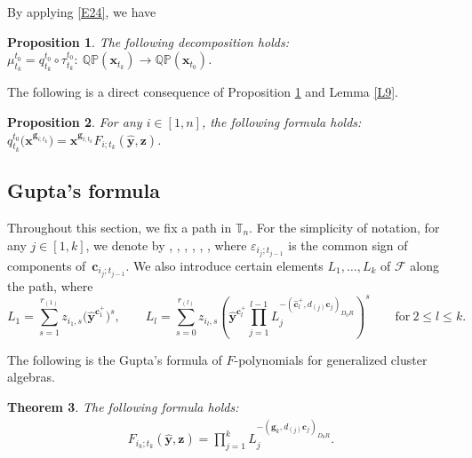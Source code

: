 \documentclass[pdftex]{sigma}
\numberwithin{equation}{section}
\newtheorem{Theorem}{Theorem}[section]
\newtheorem{Proposition}[Theorem]{Proposition}
 { \theoremstyle{definition}
\newtheorem{Definition}[Theorem]{Definition}
\newtheorem{Note}[Theorem]{Note}
\newtheorem{Example}[Theorem]{Example}
\newtheorem{Remark}[Theorem]{Remark} }
\begin{document}
By applying \eqref{E24}, we have
\begin{Proposition}\label{P11}
 The following decomposition holds:
$
\mu_{t_k}^{t_0}=q_{t_k}^{t_0}\circ\tau_{t_k}^{t_0}\colon\  \mathbb{QP}(\mathbf{x}_{t_k})\longrightarrow\mathbb{QP}(\mathbf{x}_{t_0})$.
\end{Proposition}

The following is a direct consequence of Proposition \ref{P11} and Lemma \ref{L9}.
\begin{Proposition}\label{p:FG-decomp}
 For any $i\in [1,n]$, the following formula holds:
$
 q_{t_k}^{t_0}\bigl(\mathbf{x}^{\mathbf{g}_{i;t_k}}\bigr)=\mathbf{x}^{\mathbf{g}_{i;t_k}}F_{i;t_k}(\hat{\mathbf{y}},\mathbf{z})$.
\end{Proposition}

\subsection{Gupta's formula}\label{S5}
Throughout this section, we fix a path
 in $\mathbb{T}_n$. For the simplicity of notation, for any $j\in [1,k]$, we denote by , , , , , , where $\varepsilon_{i_j;t_{j-1}}$ is the common sign of components of~$\mathbf{c}_{i_j;t_{j-1}}$.
We also introduce certain elements $L_1,\dots, L_k$ of $\mathcal{F}$ along the path, where
\[
L_1=\sum_{s=1}^{r_{(1)}}\!z_{i_1,s}\bigl(\hat{\mathbf{y}}^{\mathbf{c}_{1}^+}\bigr)^s, \qquad
L_l=\sum\limits_{s=0}^{r_{(l)}}z_{i_l,s}\left(\hat{\mathbf{y}}^{\mathbf{c}_{l}^+} \prod\limits_{j=1}^{l-1}L_j^{-(\mathbf{\hat{c}}_{l}^+,d_{(j)}\mathbf{c}_{j})_{D_0R}}\right)^s\qquad \text{for}\  2\leq l\leq k.
\]


The following is the Gupta's formula of $F$-polynomials for generalized cluster algebras.
\begin{Theorem}\label{T5}
The following formula holds:
 \begin{align}
 F_{i_k;t_k}(\hat{\mathbf{y}},\mathbf{z})=\prod\limits_{j=1}^{k}L_{j}^{-(\mathbf{g}_{k},d_{(j)}\mathbf{c}_{j})_{D_0R}}.\label{E34}
 \end{align}
\end{Theorem}
\end{document}
